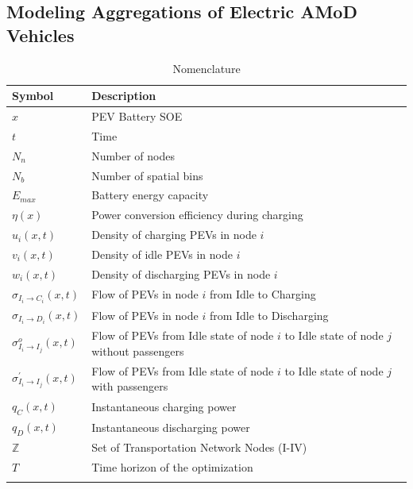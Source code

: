 \documentclass[journal]{IEEEtran}
\begin{document}
\subsection{Modeling Aggregations of Electric AMoD Vehicles}
\begin{table}[!ht]
\renewcommand{\arraystretch}{1.3}
\caption{Nomenclature}
\label{tab:symbols}
\centering
\def\colmargin{6.75cm}
\begin{tabular}{ll}
\hline
\textbf{Symbol} & \textbf{Description}\\
\hline
$x$ & PEV Battery SOE\\
$t$ & Time\\
$N_n$ & Number of nodes\\
$N_b$ & Number of spatial bins\\
$E_{max}$ & Battery energy capacity \\
$\eta(x)$ & Power conversion efficiency during charging \\
$u_i(x,t)$ & Density of charging PEVs in node $i$\\
$v_i(x,t)$ & Density of idle PEVs in node $i$\\
$w_i(x,t)$ & Density of discharging PEVs in node $i$\\
$\sigma_{I_i \rightarrow C_i}(x,t)$ & \parbox[t]{\colmargin}{ \raggedright Flow of PEVs in node $i$ from Idle to Charging} \\
$\sigma_{I_i \rightarrow D_i}(x,t)$ & \parbox[t]{\colmargin}{Flow of PEVs in node $i$ from Idle to Discharging} \\
$\sigma_{I_i \rightarrow I_j}^o(x,t)$ & \parbox[t]{\colmargin}{Flow of PEVs from Idle state of node $i$ to Idle state of node $j$ without passengers} \\
$\sigma_{I_i \rightarrow I_j}^\prime(x,t)$ & \parbox[t]{\colmargin}{ Flow of PEVs from Idle state of node $i$ to Idle state of node $j$ with passengers} \\
$q_C(x,t)$ & Instantaneous charging power \\
$q_D(x,t)$ & Instantaneous discharging power \\
$\mathbb{Z}$ & Set of Transportation Network Nodes (I-IV) \\
$T$ & Time horizon of the optimization \\
 & \\
\hline
\end{tabular}
\end{table}
\end{document}
